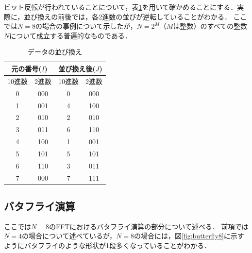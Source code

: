 ビット反転が行われていることについて，表\ref{table:bit-reverse}を用いて確かめることにする．実際に，並び換えの前後では，各2進数の並びが逆転していることがわかる．
%
ここでは$N=8$の場合の事例について示したが，$N=2^M$（$M$は整数）のすべての整数$N$について成立する普遍的なものである．



\begin{table}[ht]
\centering
\caption{データの並び換え}
\label{table:bit-reverse}
\begin{center}
\begin{tabular}{c|c||c|c}
\hline
\multicolumn{2}{c}{元の番号($I$)} & \multicolumn{2}{c}{並び換え後($J$)} \\ \hline
10進数 & 2進数 & 10進数 & 2進数 \\ \hline
0 & 000 & 0 & 000 \\ \hline
1 & 001 & 4 & 100 \\ \hline
2 & 010 & 2 & 010 \\ \hline
3 & 011 & 6 & 110 \\ \hline
4 & 100 & 1 & 001 \\ \hline
5 & 101 & 5 & 101 \\ \hline
6 & 110 & 3 & 011 \\ \hline
7 & 000 & 7 & 111 \\ \hline
\end{tabular}
\end{center}
\end{table}


\subsection{バタフライ演算}

ここでは$N=8$のFFTにおけるバタフライ演算の部分について述べる．
前項では$N=4$の場合について述べているが，$N=8$の場合には，図\ref{fig:butterfly8}に示すようにバタフライのような形状が1段多くなっていることがわかる．

